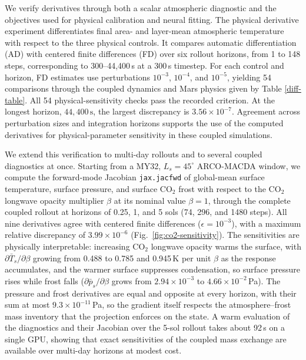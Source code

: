 \documentclass{article} %
\newcommand{\co}{CO$_2$}
\begin{document}
We verify derivatives through both a scalar atmospheric diagnostic and the objectives used for physical calibration and neural fitting. The physical derivative experiment differentiates final area- and layer-mean atmospheric temperature with respect to the three physical controls. It compares automatic differentiation (AD) with centered finite differences (FD) over six rollout horizons, from 1 to 148 steps, corresponding to 300--44{,}400\,s at a 300\,s
timestep. For each control and horizon, FD estimates use perturbations
\(10^{-3}\), \(10^{-4}\), and \(10^{-5}\), yielding 54 comparisons through the coupled dynamics and Mars physics given by Table \ref{diff-table}. All 54 physical-sensitivity checks pass the recorded criterion. At the longest horizon, \(44{,}400\,\mathrm{s}\), the largest discrepancy is \(3.56\times10^{-7}\). Agreement across perturbation sizes and integration horizons supports the use of the computed derivatives for physical-parameter sensitivity in these coupled simulations.

We extend this verification to multi-day rollouts and to several coupled diagnostics at once. Starting from a MY32, $L_s=45^\circ$ ARCO-MACDA window, we compute the forward-mode Jacobian \texttt{jax.jacfwd} of global-mean surface temperature, surface pressure, and surface \co{} frost with respect to the \co{} longwave opacity multiplier $\beta$ at its nominal value $\beta=1$, through the complete coupled rollout at horizons of 0.25, 1, and 5 sols (74, 296, and 1480 steps). All nine derivatives agree with centered finite differences ($\epsilon=10^{-3}$), with a maximum relative discrepancy of $3.99\times10^{-6}$ (Fig.~\ref{fig:co2-sensitivity}). The sensitivities are physically interpretable: increasing \co{} longwave opacity warms the surface, with $\partial\bar T_s/\partial\beta$ growing from 0.488 to 0.785 and 0.945\,K per unit $\beta$ as the response accumulates, and the warmer surface suppresses condensation, so surface pressure rises while frost falls ($\partial\bar p_s/\partial\beta$ grows from $2.94\times10^{-3}$ to $4.66\times10^{-2}$\,Pa). The pressure and frost derivatives are equal and opposite at every horizon, with their sum at most $9.3\times10^{-11}$\,Pa, so the gradient itself respects the atmosphere--frost mass inventory that the projection enforces on the state. A warm evaluation of the diagnostics and their Jacobian over the 5-sol rollout takes about 92\,s on a single GPU, showing that exact sensitivities of the coupled mass exchange are available over multi-day horizons at modest cost.
\end{document}
